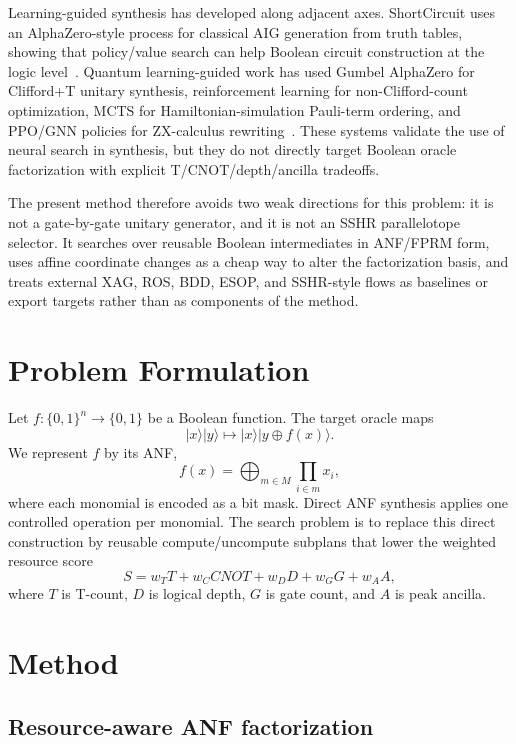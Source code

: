 \documentclass[11pt]{article}
\begin{document}
Learning-guided synthesis has developed along adjacent axes.  ShortCircuit uses
an AlphaZero-style process for classical AIG generation from truth tables,
showing that policy/value search can help Boolean circuit construction at the
logic level~\cite{tsaras2024shortcircuit}.  Quantum learning-guided work has
used Gumbel AlphaZero for Clifford+T unitary synthesis, reinforcement learning
for non-Clifford-count optimization, MCTS for Hamiltonian-simulation Pauli-term
ordering, and PPO/GNN policies for ZX-calculus rewriting~\cite{rietsch2024unitary,kremer2025nonclifford,machiya2026monteq,riu2025rlzx}.
These systems validate the use of neural search in synthesis, but they do not
directly target Boolean oracle factorization with explicit T/CNOT/depth/ancilla
tradeoffs.

The present method therefore avoids two weak directions for this problem: it is
not a gate-by-gate unitary generator, and it is not an SSHR parallelotope
selector.  It searches over reusable Boolean intermediates in ANF/FPRM form,
uses affine coordinate changes as a cheap way to alter the factorization basis,
and treats external XAG, ROS, BDD, ESOP, and SSHR-style flows as baselines or
export targets rather than as components of the method.

\section{Problem Formulation}

Let $f:\{0,1\}^n\rightarrow\{0,1\}$ be a Boolean function.  The target oracle
maps
\[
  |x\rangle |y\rangle \mapsto |x\rangle |y \oplus f(x)\rangle .
\]
We represent $f$ by its ANF,
\[
  f(x) = \bigoplus_{m\in M}\prod_{i\in m} x_i,
\]
where each monomial is encoded as a bit mask.  Direct ANF synthesis applies one
controlled operation per monomial.  The search problem is to replace this direct
construction by reusable compute/uncompute subplans that lower the weighted
resource score
\[
  S = w_T T + w_C CNOT + w_D D + w_G G + w_A A,
\]
where $T$ is T-count, $D$ is logical depth, $G$ is gate count, and $A$ is peak
ancilla.

\section{Method}

\subsection{Resource-aware ANF factorization}
\end{document}
